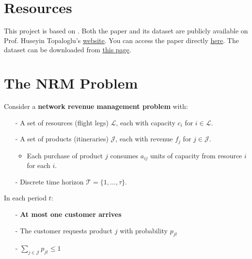 \documentclass[11pt]{article}
\begin{document}
\section{Resources}

This project is based on \cite{topaloglu2009using}.
Both the paper and its dataset are publicly available on Prof. Huseyin Topaloglu's \underline{\href{https://people.orie.cornell.edu/huseyin}{website}}. 
You can access the paper directly \underline{\href{https://people.orie.cornell.edu/huseyin/publications/revenue_man.pdf}{here}}.
The dataset can be downloaded from \underline{\href{https://people.orie.cornell.edu/huseyin/research/rm_datasets/rm_datasets.html}{this page}}.

\vspace{0.5cm}




\section{The NRM Problem}

Consider a \textbf{network revenue management problem} with:
\begin{itemize}[itemsep=0pt,parsep=0pt]
\item[-] A set of resources (flight legs) $\mathcal{L}$, each with capacity $c_i$ for $i\in \mathcal{L}$. 
\item[-] A set of products (itineraries) $\mathcal{J}$, each with revenue $f_j$ for $j\in \mathcal{J}$. 
    \begin{itemize}[itemsep=0pt,parsep=0pt]
    \item Each purchase of product $j$ consumes $a_{ij}$ units of capacity from resource $i$ for each $i$. 
    \end{itemize}
\item[-] Discrete time horizon $\mathcal{T}=\{1,\ldots,\tau\}$. 
\end{itemize}

\noindent
In each period $t$:
\begin{itemize}[itemsep=0pt,parsep=0pt]
\item[-] \textbf{At most one customer arrives}
\item[-] The customer requests product $j$ with probability $p_{jt}$
\item[-] $\sum_{j\in \mathcal{J}} p_{jt} \le 1$
\end{itemize}
\end{document}
